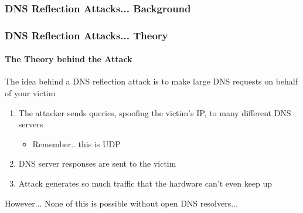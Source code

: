 \documentclass{beamer}
\begin{document}
\begin{frame}[fragile]
	\frametitle{DNS Reflection Attacks... Background}
\end{frame}

\begin{frame}
	\frametitle{DNS Reflection Attacks... Theory}
	\framesubtitle{The Theory behind the Attack}
	The idea behind a DNS reflection attack is to make large DNS requests on
	behalf of your victim
	\begin{enumerate}
		\item The attacker sends queries, spoofing the victim's IP, to many
			different DNS servers
			\begin{itemize}
				\item Remember.. this is UDP
			\end{itemize}
		\item DNS server responses are sent to the victim
		\item Attack generates so much traffic that the hardware can't even keep up
	\end{enumerate}
	However... None of this is possible without open DNS resolvers...
\end{frame}
\end{document}

